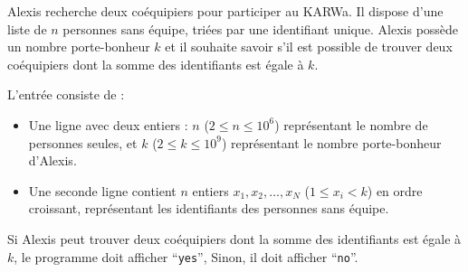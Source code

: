 \problemname{\problemyamlname}


\newcommand{\maxa}{123456789}

Alexis recherche deux coéquipiers pour participer au KARWa. Il dispose d'une liste de $n$ personnes sans équipe, triées par une identifiant unique.
Alexis possède un nombre porte-bonheur $k$ et il souhaite savoir s'il est possible de trouver deux coéquipiers dont la somme des identifiants est égale à $k$.

\begin{Input}
	L'entrée consiste de :
	\begin{itemize}
		\item Une ligne avec deux entiers : $n$ ($2 \le n \le 10^6$) représentant le nombre de personnes seules, et $k$ ($2 \le k \le 10^9$) représentant le nombre porte-bonheur d'Alexis.
		\item Une seconde ligne contient $n$ entiers $x_1, x_2, \dots, x_N$ ($1 \le x_i < k$) en ordre croissant, représentant les identifiants des personnes sans équipe.
	\end{itemize}
\end{Input}

\begin{Output}
	Si Alexis peut trouver deux coéquipiers dont la somme des identifiants est égale à $k$, le programme doit afficher ``\verb|yes|'', Sinon, il doit afficher ``\verb|no|''.
\end{Output}
